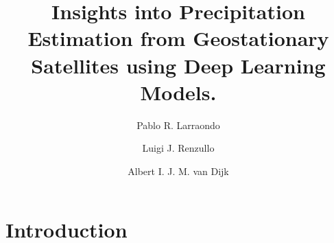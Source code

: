 \documentclass[3p,times]{elsarticle}
\begin{document}
\begin{frontmatter}



\dochead{}

\title{Insights into Precipitation Estimation from Geostationary Satellites using Deep Learning Models.}


\author[1]{Pablo R. Larraondo}
\author[1]{Luigi J. Renzullo}
\author[1]{Albert I. J. M. van Dijk}

\address[1]{Fenner School of Environment and Society. Australian National University. Canberra, Australia}

\begin{abstract}
\end{abstract}

\begin{keyword}


\end{keyword}

\end{frontmatter}


\section{Introduction}
\label{}
\end{document}
